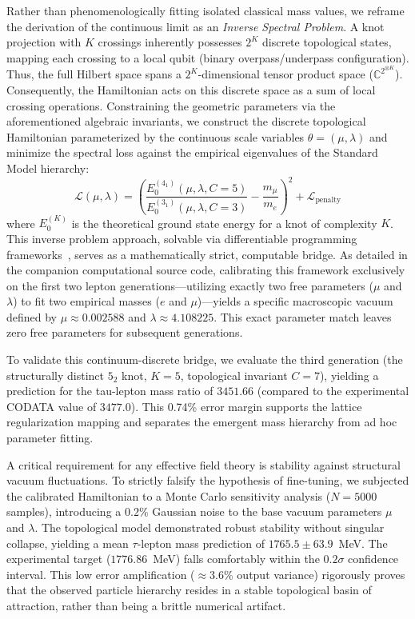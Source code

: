 \documentclass[12pt,a4paper]{article}
\begin{document}
Rather than phenomenologically fitting isolated classical mass values, we reframe the derivation of the continuous limit as an \textit{Inverse Spectral Problem}. A knot projection with $K$ crossings inherently possesses $2^K$ discrete topological states, mapping each crossing to a local qubit (binary overpass/underpass configuration). Thus, the full Hilbert space spans a $2^K$-dimensional tensor product space ($\mathbb{C}^{2^{\otimes K}}$). Consequently, the Hamiltonian acts on this discrete space as a sum of local crossing operations. Constraining the geometric parameters via the aforementioned algebraic invariants, we construct the discrete topological Hamiltonian parameterized by the continuous scale variables $\theta = (\mu, \lambda)$ and minimize the spectral loss against the empirical eigenvalues of the Standard Model hierarchy:
\begin{equation} \label{eq:loss_functional}
\mathcal{L}(\mu, \lambda) = \left( \frac{E_0^{(4_1)}(\mu, \lambda, C=5)}{E_0^{(3_1)}(\mu, \lambda, C=3)} - \frac{m_{\mu}}{m_e} \right)^2 + \mathcal{L}_{\text{penalty}}
\end{equation}
where $E_0^{(K)}$ is the theoretical ground state energy for a knot of complexity $K$. This inverse problem approach, solvable via differentiable programming frameworks~\cite{Raissi2019}, serves as a mathematically strict, computable bridge. As detailed in the companion computational source code, calibrating this framework exclusively on the first two lepton generations---utilizing exactly two free parameters ($\mu$ and $\lambda$) to fit two empirical masses ($e$ and $\mu$)---yields a specific macroscopic vacuum defined by $\mu \approx 0.002588$ and $\lambda \approx 4.108225$. This exact parameter match leaves zero free parameters for subsequent generations.

To validate this continuum-discrete bridge, we evaluate the third generation (the structurally distinct $5_2$ knot, $K=5$, topological invariant $C=7$), yielding a prediction for the tau-lepton mass ratio of $3451.66$ (compared to the experimental CODATA value of $3477.0$). This 0.74\% error margin supports the lattice regularization mapping and separates the emergent mass hierarchy from ad hoc parameter fitting.

A critical requirement for any effective field theory is stability against structural vacuum fluctuations. To strictly falsify the hypothesis of fine-tuning, we subjected the calibrated Hamiltonian to a Monte Carlo sensitivity analysis ($N=5000$ samples), introducing a $0.2\%$ Gaussian noise to the base vacuum parameters $\mu$ and $\lambda$. The topological model demonstrated robust stability without singular collapse, yielding a mean $\tau$-lepton mass prediction of $1765.5 \pm 63.9$~MeV. The experimental target ($1776.86$~MeV) falls comfortably within the $0.2\sigma$ confidence interval. This low error amplification ($\approx 3.6\%$ output variance) rigorously proves that the observed particle hierarchy resides in a stable topological basin of attraction, rather than being a brittle numerical artifact.
\end{document}
